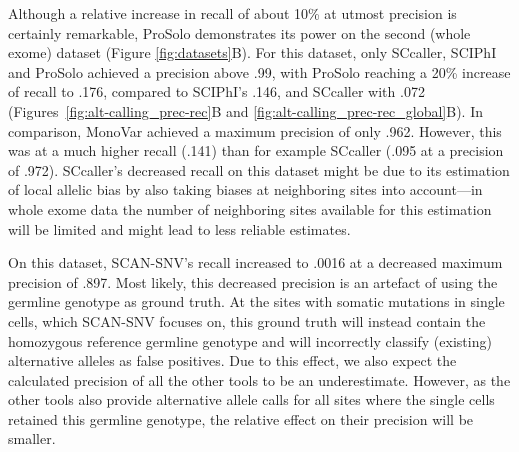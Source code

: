 \documentclass[12pt,inline]{wlscirep}
\begin{document}
Although a relative increase in recall of about 10\% at utmost precision is certainly remarkable, ProSolo demonstrates its power on the second (whole exome) dataset (Figure \ref{fig:datasets}B).
For this dataset, only SCcaller, SCIPhI and ProSolo achieved a precision above .99, with ProSolo reaching a 20\% increase of recall to .176, compared to SCIPhI's .146, and SCcaller with .072 (Figures~\ref{fig:alt-calling_prec-rec}B and \ref{fig:alt-calling_prec-rec_global}B).
In comparison, MonoVar achieved a maximum precision of only .962. However, this was at a much higher recall (.141) than for example SCcaller (.095 at a precision of .972).
SCcaller's decreased recall on this dataset might be due to its estimation of local allelic bias by also taking biases at neighboring sites into account---in whole exome data the number of neighboring sites available for this estimation will be limited and might lead to less reliable estimates.

On this dataset, SCAN-SNV's recall increased to .0016 at a decreased maximum precision of .897.
Most likely, this decreased precision is an artefact of using the germline genotype as ground truth.
At the sites with somatic mutations in single cells, which SCAN-SNV focuses on, this ground truth will instead contain the homozygous reference germline genotype and will incorrectly classify (existing) alternative alleles as false positives.
Due to this effect, we also expect the calculated precision of all the other tools to be an underestimate.
However, as the other tools also provide alternative allele calls for all sites where the single cells retained this germline genotype, the relative effect on their precision will be smaller.
\end{document}
